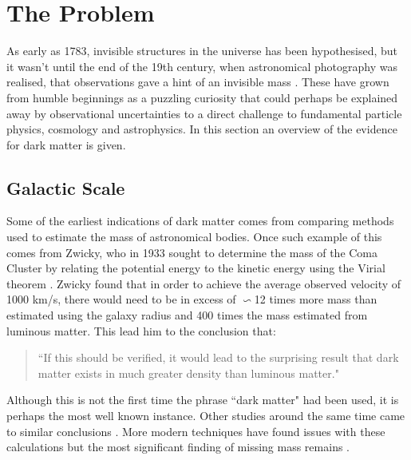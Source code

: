 \section{The Problem}

\par
As early as 1783, invisible structures in the universe has been hypothesised, but it wasn't until the end of the 19th century, when astronomical photography was realised, that observations gave a hint of an invisible mass \cite{History_Of_Dark_Matter_2018_ref}.
These have grown from humble beginnings as a puzzling curiosity that could perhaps be explained away by observational uncertainties to a direct challenge to fundamental particle physics, cosmology and astrophysics.
In this section an overview of the evidence for dark matter is given.

%
%


\subsection{Galactic Scale}

\par
Some of the earliest indications of dark matter comes from comparing methods used to estimate the mass of astronomical bodies.
Once such example of this comes from Zwicky, who in 1933 sought to determine the mass of the Coma Cluster by relating the potential energy to the kinetic energy using the Virial theorem \cite{Fritz_Zwicky_1933_ref}.
Zwicky found that in order to achieve the average observed velocity of 1000 km/s, there would need to be in excess of $\backsim$12 times more mass than estimated using the galaxy radius and 400 times the mass estimated from luminous matter.
This lead him to the conclusion that:
\begin{quote}
``If this should be verified, it would lead to the surprising result that dark matter
exists in much greater density than luminous matter."
\end{quote}
Although this is not the first time the phrase ``dark matter" had been used, it is perhaps the most well known instance.
Other studies around the same time came to similar conclusions \cite{hubble_and_co_viral_theorem_ref}.
More modern techniques have found issues with these calculations but the most significant finding of missing mass remains \cite{a_second_history_of_dark_matter_ref}.

